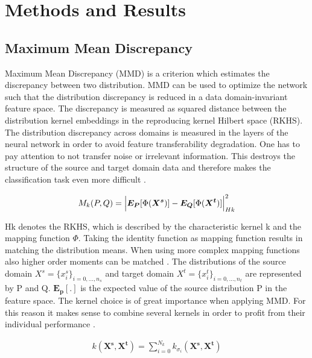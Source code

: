 
\chapter{Methods and Results}\label{chapter:introduction}


\section{Maximum Mean Discrepancy}
Maximum Mean Discrepancy (MMD) is a criterion which estimates the discrepancy between two distribution. MMD can be used to optimize the network such that the distribution discrepancy is reduced in a data domain-invariant feature space. The discrepancy is measured as squared distance between the distribution kernel embeddings in the reproducing kernel Hilbert space (RKHS). The distribution discrepancy across domains is measured in the layers of the neural network in order to avoid feature transferability degradation. One has to pay attention to not transfer noise or irrelevant information. This destroys the structure of the source and target domain data and therefore makes the classification task even more difficult \cite{li2020}. 

\begin{align}
    M_{k}(P,Q) = \Bigl|  \boldsymbol{E_{P}}[\Phi(\boldsymbol{X^{s}})] - \boldsymbol{E_{Q}}[\Phi(\boldsymbol{X^{t}})]     \Bigl|^{2}_{Hk}
\end{align}

Hk denotes the RKHS, which is described by the characteristic kernel k and the mapping function $\Phi$. Taking the identity function as mapping function results in matching the distribution means. When using more complex mapping functions also higher order moments can be matched \cite{Yujia2015}. The distributions of the source domain $X^{s} = \{{x}_{i}^{s}\}_{i=0,...,n_{s}}$ and target domain $X^{t} = \{{x}_{i}^{t}\}_{i=0,...,n_{t}}$ are represented by P and Q. $\boldsymbol{E_{p}[.]}$ is the expected value of the source distribution P in the feature space. The kernel choice is of great importance when applying MMD. For this reason it makes sense to combine several kernels in order to profit from their individual performance \cite{li2020}.

\begin{align}
    k(\boldsymbol{X^{s}}, \boldsymbol{X^{t}}) = \sum_{i=0}^{N_{k}} k_{\sigma_{i}}(\boldsymbol{X^{s}}, \boldsymbol{X^{t}})
\end{align}

